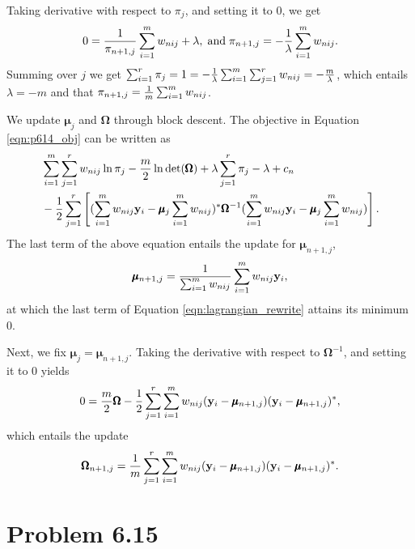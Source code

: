 \documentclass{scrartcl}
\begin{document}
Taking derivative with respect to $\pi_j$, and setting it to 0, we get
\begin{equation}
0 = {1 \over \pi_{n+1,j}} \sum_{i=1}^m w_{nij} + \lambda , \; \text{and\;} \pi_{n+1,j} = - {1 \over \lambda} \sum_{i=1}^m w_{nij}.
\end{equation}
Summing over $j$ we get $\sum_{i=1}^r \pi_j = 1 = - {1 \over \lambda} \sum_{i=1}^m \sum_{j=1}^r w_{nij} = - {m \over \lambda}$, which entails
$\lambda = -m$ and that $\pi_{n+1,j} = {1 \over m} \sum_{i=1}^m w_{nij}$.

We update $\pmb{\mu}_j$ and $\pmb{\Omega}$ through block descent. The objective in Equation \eqref{eqn:p614_obj} can be written as
\begin{equation}
\begin{split}
& \sum_{i=1}^m \sum_{j=1}^r { w_{nij} } \ln \pi_j - {m \over 2} \ln \det(\pmb{\Omega}) + \lambda \sum_{j=1}^r \pi_j - \lambda + c_n \\
& - {1\over 2} \sum_{j=1}^r \left[ ( \sum_{i=1}^m w_{nij} \mathbf{y}_i-\pmb{\mu}_j \sum_{i=1}^m w_{nij})^*\pmb{\Omega}^{-1}
( \sum_{i=1}^m w_{nij} \mathbf{y}_i-\pmb{\mu}_j \sum_{i=1}^m w_{nij}) \right].
\end{split}
\label{eqn:lagrangian_rewrite}
\end{equation}
The last term of the above equation entails the update for $\pmb{\mu}_{n+1,j}$,
\begin{equation}
\pmb{\mu}_{n+1,j} = {1 \over \sum_{i=1}^m w_{nij}}\sum_{i=1}^m w_{nij} \mathbf{y}_i,
\end{equation}
at which the last term of Equation \eqref{eqn:lagrangian_rewrite} attains its minimum 0.

Next, we fix $\pmb{\mu}_j = \pmb{\mu}_{n+1,j}$.  Taking the derivative with respect to $\pmb{\Omega}^{-1}$, and setting it to 0 yields
\begin{equation}
0 = {m \over 2} \pmb{\Omega} - {1 \over 2} \sum_{j=1}^r \sum_{i=1}^m w_{nij} (\mathbf{y}_i-\pmb{\mu}_{n+1,j})(\mathbf{y}_i-\pmb{\mu}_{n+1,j})^* ,
\end{equation}
which entails the update
\begin{equation}
\pmb{\Omega}_{n+1,j} = {1 \over m} \sum_{j=1}^r \sum_{i=1}^m w_{nij} (\mathbf{y}_i-\pmb{\mu}_{n+1,j})(\mathbf{y}_i-\pmb{\mu}_{n+1,j})^* .
\end{equation}


\section*{Problem 6.15}
\end{document}
